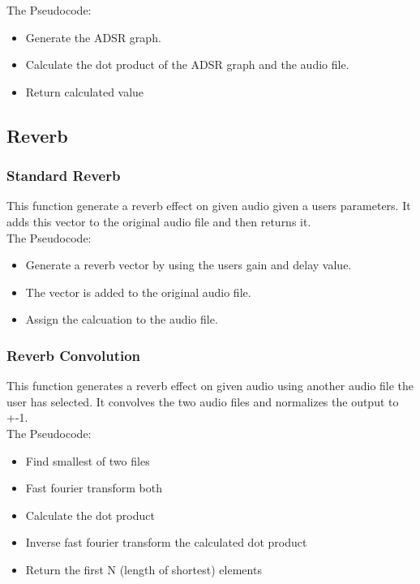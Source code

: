 \documentclass[12pt]{article}
\begin{document}
				The Pseudocode:

				\begin{itemize}
					\item Generate the ADSR graph.
					\item Calculate the dot product of the ADSR graph and the audio file.
					\item Return calculated value 
				\end{itemize}

			\subsection{Reverb}

			\subsubsection{Standard Reverb}

				This function generate a reverb effect on given audio given a users parameters. It adds this vector to the original audio file and then returns it. \\

				The Pseudocode:

				\begin{itemize}
					\item Generate a reverb vector by using the users gain and delay value.  
					\item The vector is added to the original audio file.
					\item Assign the calcuation to the audio file.
				\end{itemize}

			\subsubsection{Reverb Convolution}
				
				This function generates a reverb effect on given audio using another audio file the user has selected. It convolves the two audio files and normalizes the output to +-1.  \\
				The Pseudocode:

				\begin{itemize}
					\item Find smallest of two files
					\item Fast fourier transform both
					\item Calculate the dot product
					\item Inverse fast fourier transform the calculated dot product
					\item Return the first N (length of shortest) elements
				\end{itemize}
\end{document}
